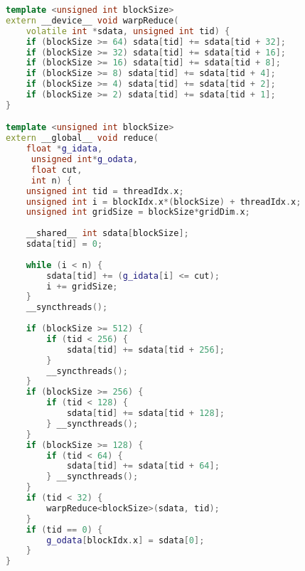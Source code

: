 \documentclass[]{article}
\begin{document}
\begin{comment}
\newcommand{\kernel}[3]{
\foreach \i in {1,...,#3}
{
	\draw[darkgray, line width=4pt] 
	({#1 cm / #3 cm * (\i-1 cm)  - 0.2 cm * (\i-1 cm)} ,#2 cm) -- 
	+({(#1 cm / #3 cm)  - 0.2 cm}, 0cm);
	
}
}
	
\begin{figure}
	\begin{center}
		\begin{tikzpicture}
			\kernel{10}{4}{4};
			
			\draw[thick, -Triangle] (-0.5cm,0cm) -- (-.5cm,-3cm) node[font=\scriptsize,below left=3pt and -8pt]{t};
			
			\draw[darkgray, line width=4pt] 
			(0,0) -- +(12,0);
			
			\draw[darkgray, line width=4pt] 
			(0cm,-1cm) -- +(4.75cm,0);
			
			\draw[darkgray, line width=4pt] 
			(5.25cm,-1cm) -- +(4.75cm,0);
			
			
			\draw[darkgray, line width=4pt] 
			(0cm,-2cm) -- +(2.25cm,0);
			
			\draw[darkgray, line width=4pt] 
			(2.75cm,-2cm) -- +(2.25cm,0);

			
		\end{tikzpicture}
	\end{center}
	\caption{timeline}
	\label{u}
\end{figure}
\end{comment}

\begin{lstlisting}[language=c++, caption=Conditional Reduction in CUDA, label=cuda:reduction]
template <unsigned int blockSize>
extern __device__ void warpReduce(
	volatile int *sdata, unsigned int tid) {
	if (blockSize >= 64) sdata[tid] += sdata[tid + 32];
	if (blockSize >= 32) sdata[tid] += sdata[tid + 16];
	if (blockSize >= 16) sdata[tid] += sdata[tid + 8];
	if (blockSize >= 8) sdata[tid] += sdata[tid + 4];
	if (blockSize >= 4) sdata[tid] += sdata[tid + 2];
	if (blockSize >= 2) sdata[tid] += sdata[tid + 1];
}

template <unsigned int blockSize>
extern __global__ void reduce(
	float *g_idata,
	 unsigned int*g_odata, 
	 float cut, 
	 int n) {
	unsigned int tid = threadIdx.x;
	unsigned int i = blockIdx.x*(blockSize) + threadIdx.x;
	unsigned int gridSize = blockSize*gridDim.x;
	
	__shared__ int sdata[blockSize];
	sdata[tid] = 0;
	
	while (i < n) {
		sdata[tid] += (g_idata[i] <= cut);
		i += gridSize;
	}
	__syncthreads();
	
	if (blockSize >= 512) {
		if (tid < 256) {
			sdata[tid] += sdata[tid + 256];
		}
		__syncthreads();
	}
	if (blockSize >= 256) {
		if (tid < 128) {
			sdata[tid] += sdata[tid + 128];
		} __syncthreads();
	}
	if (blockSize >= 128) {
		if (tid < 64) {
			sdata[tid] += sdata[tid + 64];
		} __syncthreads();
	}
	if (tid < 32) {
		warpReduce<blockSize>(sdata, tid);
	}
	if (tid == 0) {
		g_odata[blockIdx.x] = sdata[0];
	}
}
\end{lstlisting}
\end{document}
